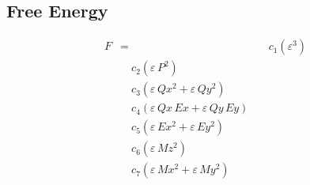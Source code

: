 \documentclass{article}
\begin{document}
\subsection*{Free Energy}

\begin{align*}
F &=
  &\quad c_{1} \left(ε^{3}\right) \\
  &\quad c_{2} \left(ε\,P^{2}\right) \\
  &\quad c_{3} \left(ε\,Qx^{2} + ε\,Qy^{2}\right) \\
  &\quad c_{4} \left(ε\,Qx\,Ex + ε\,Qy\,Ey\right) \\
  &\quad c_{5} \left(ε\,Ex^{2} + ε\,Ey^{2}\right) \\
  &\quad c_{6} \left(ε\,Mz^{2}\right) \\
  &\quad c_{7} \left(ε\,Mx^{2} + ε\,My^{2}\right)
\end{align*}
\end{document}
